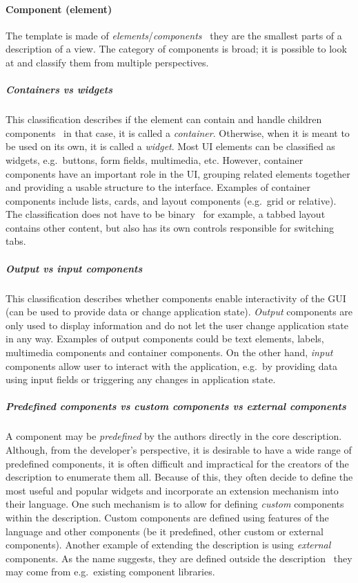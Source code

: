 \paragraph{Component (element)}
The template is made of \emph{elements}/\emph{components} \textendash\ they are the smallest parts of a description of a view.
The category of components is broad;
it is possible to look at and classify them from multiple perspectives.

\subparagraph{Containers vs widgets}
This classification describes if the element can contain and handle children components \textendash\ in that case, it is called a \emph{container}.
Otherwise, when it is meant to be used on its own, it is called a \emph{widget}.
Most UI elements can be classified as widgets, e.g.\ buttons, form fields, multimedia, etc.
However, container components have an important role in the UI, grouping related elements together and providing a usable structure to the interface.
Examples of container components include lists, cards, and layout components (e.g.\ grid or relative).
The classification does not have to be binary \textendash\ for example, a tabbed layout contains other content, but also has its own controls responsible for switching tabs.

\subparagraph{Output vs input components}
This classification describes whether components enable interactivity of the GUI (can be used to provide data or change application state).
\emph{Output} components are only used to display information and do not let the user change application state in any way.
Examples of output components could be text elements, labels, multimedia components and container components.
On the other hand, \emph{input} components allow user to interact with the application, e.g.\ by providing data using input fields or triggering any changes in application state.

\subparagraph{Predefined components vs custom components vs external components}
A component may be \emph{predefined} by the authors directly in the core description.
Although, from the developer's perspective, it is desirable to have a wide range of predefined components, it is often difficult and impractical for the creators of the description to enumerate them all.
Because of this, they often decide to define the most useful and popular widgets and incorporate an extension mechanism into their language.
One such mechanism is to allow for defining \emph{custom} components within the description.
Custom components are defined using features of the language and other components (be it predefined, other custom or external components).
Another example of extending the description is using \emph{external} components.
As the name suggests, they are defined outside the description \textendash\ they may come from e.g.\ existing component libraries.


